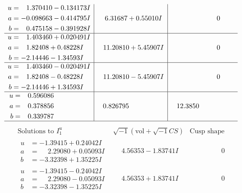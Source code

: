 \documentclass[1p]{elsarticle_modified}
\theoremstyle{definition}
\newcommand{\I}{\sqrt{-1}}
\begin{document}
$$\begin{array}{c|c|c}
\begin{aligned}
u &= \phantom{-}1.370410 - 0.134173 I \\
a &= -0.098663 - 0.414795 I \\
b &= \phantom{-}0.475158 - 0.391928 I\end{aligned}
 & \phantom{-}6.31687 + 0.55010 I & \phantom{-0.000000 } 0 \\ \hline\begin{aligned}
u &= \phantom{-}1.403460 + 0.020491 I \\
a &= \phantom{-}1.82408 + 0.48228 I \\
b &= -2.14446 - 1.34593 I\end{aligned}
 & \phantom{-}11.20810 + 5.45907 I & \phantom{-0.000000 } 0 \\ \hline\begin{aligned}
u &= \phantom{-}1.403460 - 0.020491 I \\
a &= \phantom{-}1.82408 - 0.48228 I \\
b &= -2.14446 + 1.34593 I\end{aligned}
 & \phantom{-}11.20810 - 5.45907 I & \phantom{-0.000000 } 0 \\ \hline\begin{aligned}
u &= \phantom{-}0.596086\phantom{ +0.000000I} \\
a &= \phantom{-}0.378856\phantom{ +0.000000I} \\
b &= \phantom{-}0.339787\phantom{ +0.000000I}\end{aligned}
 & \phantom{-}0.826795\phantom{ +0.000000I} & \phantom{-}12.3850\phantom{ +0.000000I}\\
 \hline 
 \end{array}$$\newpage$$\begin{array}{c|c|c}  
\text{Solutions to }I^u_{1}& \I (\text{vol} + \sqrt{-1}CS) & \text{Cusp shape}\\
 \hline 
\begin{aligned}
u &= -1.39415 + 0.24042 I \\
a &= \phantom{-}2.29080 + 0.05093 I \\
b &= -3.32398 + 1.35225 I\end{aligned}
 & \phantom{-}4.56353 - 1.83741 I & \phantom{-0.000000 } 0 \\ \hline\begin{aligned}
u &= -1.39415 - 0.24042 I \\
a &= \phantom{-}2.29080 - 0.05093 I \\
b &= -3.32398 - 1.35225 I\end{aligned}
 & \phantom{-}4.56353 + 1.83741 I & \phantom{-0.000000 } 0 \\ \hline\begin{aligned}

\end{aligned}
\end{array}$$
\end{document}
